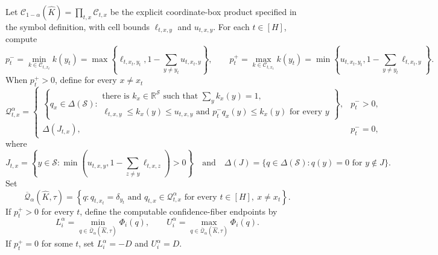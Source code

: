 Let \(\mathcal C_{1-\alpha}(\widehat K)=\prod_{t,x}\mathcal C_{t,x}\) be the explicit coordinate-box product specified in the symbol definition, with cell bounds \(\ell_{t,x,y}\) and \(u_{t,x,y}\).  For each \(t\in[H]\), compute
\[
 p_t^-=\min_{k\in\mathcal C_{t,x_t}}k(y_t)
 =\max\!\left\{\ell_{t,x_t,y_t},
       1-\sum_{y\ne y_t}u_{t,x_t,y}\right\},
 \qquad
 p_t^+=\max_{k\in\mathcal C_{t,x_t}}k(y_t)
 =\min\!\left\{u_{t,x_t,y_t},
       1-\sum_{y\ne y_t}\ell_{t,x_t,y}\right\}.
\]
When \(p_t^+>0\), define for every \(x\ne x_t\)
\[
 \mathcal Q_{t,x}^{\alpha}=
 \begin{cases}
 \left\{q_x\in\Delta(\mathcal S):
   \begin{array}{l}
   \text{there is }k_x\in\mathbb R^{\mathcal S}\text{ such that }
   \sum_y k_x(y)=1,\\
   \ell_{t,x,y}\le k_x(y)\le u_{t,x,y}\text{ and }
   p_t^-q_x(y)\le k_x(y)\text{ for every }y
   \end{array}\right\},&p_t^->0,\\[6pt]
 \Delta(J_{t,x}),&p_t^-=0,
 \end{cases}
\]
where
\[
 J_{t,x}=\left\{y\in\mathcal S:
 \min\!\left(u_{t,x,y},1-\sum_{z\ne y}\ell_{t,x,z}\right)>0\right\}
 \quad\text{and}\quad
 \Delta(J)=\{q\in\Delta(\mathcal S):q(y)=0\text{ for }y\notin J\}.
\]
Set
\[
 \overline{\mathcal Q}_{\alpha}(\widehat K,\tau)
 =\left\{q:q_{t,x_t}=\delta_{y_t}\text{ and }
 q_{t,x}\in\mathcal Q_{t,x}^{\alpha}
 \text{ for every }t\in[H],\ x\ne x_t\right\}.
\]
If \(p_t^+>0\) for every \(t\), define the computable confidence-fiber endpoints by
\[
 L_i^{\alpha}=\min_{q\in\overline{\mathcal Q}_{\alpha}(\widehat K,\tau)}\Phi_i(q),
 \qquad
 U_i^{\alpha}=\max_{q\in\overline{\mathcal Q}_{\alpha}(\widehat K,\tau)}\Phi_i(q).
\]
If \(p_t^+=0\) for some \(t\), set
\(L_i^{\alpha}=-D\) and \(U_i^{\alpha}=D\).